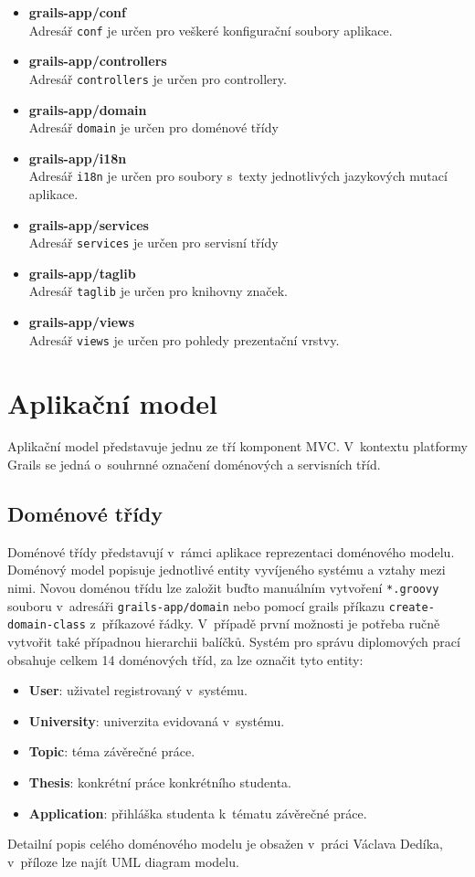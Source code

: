 \begin{itemize}
\item \textbf{grails-app/conf}\\
Adresář \texttt{conf} je určen pro veškeré konfigurační soubory aplikace.
\item \textbf{grails-app/controllers}\\
Adresář \texttt{controllers} je určen pro controllery.
\item \textbf{grails-app/domain}\\
Adresář \texttt{domain} je určen pro doménové třídy
\item \textbf{grails-app/i18n}\\
Adresář \texttt{i18n} je určen pro soubory s~texty jednotlivých jazykových mutací aplikace.
\item \textbf{grails-app/services}\\
Adresář \texttt{services} je určen pro servisní třídy
\item \textbf{grails-app/taglib}\\
Adresář \texttt{taglib} je určen pro knihovny značek.
\item \textbf{grails-app/views}\\
Adresář \texttt{views} je určen pro pohledy prezentační vrstvy.
\end{itemize}

\section{Aplikační model}
Aplikační model představuje jednu ze tří komponent MVC. V~kontextu platformy Grails se jedná o~souhrnné označení doménových a servisních tříd.

\subsection{Doménové třídy}
Doménové třídy představují v~rámci aplikace reprezentaci doménového modelu. Doménový model popisuje jednotlivé entity vyvíjeného systému a vztahy mezi nimi. Novou doménou třídu lze založit buďto manuálním vytvoření \texttt{*.groovy} souboru v~adresáři \texttt{grails-app/domain} nebo pomocí grails příkazu \texttt{create-domain-class} z~příkazové řádky. V~případě první možnosti je potřeba ručně vytvořit také případnou hierarchii balíčků. Systém pro správu diplomových prací obsahuje celkem 14 doménových tříd, za  lze označit tyto entity:
\begin{itemize}
\item \textbf{User}: uživatel registrovaný v~systému.
\item \textbf{University}: univerzita evidovaná v~systému.
\item \textbf{Topic}: téma závěrečné práce.
\item \textbf{Thesis}: konkrétní práce konkrétního studenta.
\item \textbf{Application}: přihláška studenta k~tématu závěrečné práce.
\end{itemize}
Detailní popis celého doménového modelu je obsažen v~práci Václava Dedíka\cite{vena-bp}, v~příloze lze najít UML diagram modelu\cite{vena-bp}.

